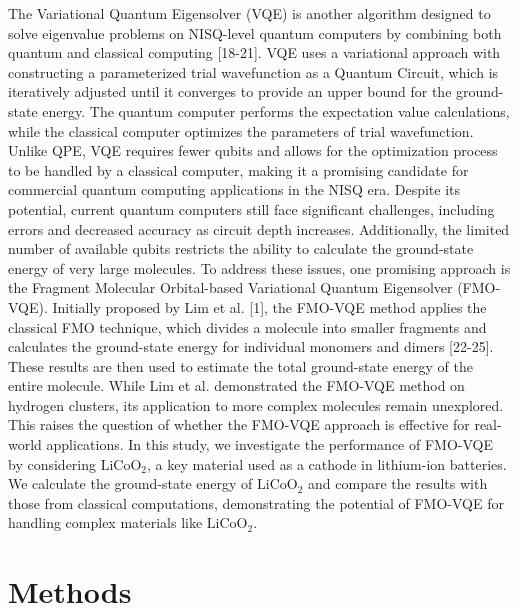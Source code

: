 \documentclass[pdflatex,sn-mathphys-num]{sn-jnl}%
\theoremstyle{thmstyleone}%
\theoremstyle{thmstyletwo}%
\theoremstyle{thmstylethree}%
\begin{document}
The Variational Quantum Eigensolver (VQE) is another algorithm designed to solve eigenvalue problems on NISQ-level quantum computers by combining both quantum and classical computing [18-21].
VQE uses a variational approach with constructing a parameterized trial wavefunction as a Quantum Circuit, 
which is iteratively adjusted until it converges to provide an upper bound for the ground-state energy. 
The quantum computer performs the expectation value calculations, while the classical computer optimizes the parameters of trial wavefunction.
Unlike QPE, VQE requires fewer qubits and allows for the optimization process to be handled by a classical computer, 
making it a promising candidate for commercial quantum computing applications in the NISQ era. 
Despite its potential, current quantum computers still face significant challenges, including errors and decreased accuracy as circuit depth increases. 
Additionally, the limited number of available qubits restricts the ability to calculate the ground-state energy of very large molecules. 
To address these issues, one promising approach is the Fragment Molecular Orbital-based Variational Quantum Eigensolver (FMO-VQE).
Initially proposed by Lim et al. [1], the FMO-VQE method applies the classical FMO technique, which divides a molecule into smaller fragments and calculates the ground-state energy for individual monomers and dimers [22-25]. 
These results are then used to estimate the total ground-state energy of the entire molecule. 
While Lim et al. demonstrated the FMO-VQE method on hydrogen clusters, its application to more complex molecules remain unexplored. 
This raises the question of whether the FMO-VQE approach is effective for real-world applications. 
In this study, we investigate the performance of FMO-VQE by considering \(\mathrm{LiCoO_2}\), a key material used as a cathode in lithium-ion batteries. We calculate the ground-state energy of \(\mathrm{LiCoO_2}\) and compare the results with those from classical computations, demonstrating the potential of FMO-VQE for handling complex materials like \(\mathrm{LiCoO_2}\).

\section{Methods}\label{sec2}
\end{document}
